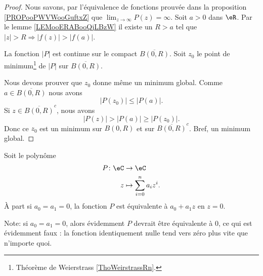 \begin{proof}
	Nous savons, par l'équivalence de fonctions prouvée dans la proposition \ref{PROPooPWVWooGuftxZ} que \( \lim_{z\to \infty} P(z)=\infty\). Soit \( a>0\) dans \( \eR\). Par le lemme \ref{LEMooERABooQjLBzW} il existe un \( R>a\) tel que \( | z |>R\Rightarrow | f(z) |>| f(a) |\).

	La fonction \( | P |\) est continue sur le compact \( \overline{ B(0,R) }\). Soit \( z_0\) le point de minimum\footnote{Théorème de Weierstrass \ref{ThoWeirstrassRn}.} de \( | P |\) sur \( \overline{ B(0,R) }\).

	Nous devons prouver que \( z_0\) donne même un minimum global. Comme \( a\in\overline{ B(0,R) }\) nous avons
	\begin{equation}
		| P(z_0) |\leq | P(a) |.
	\end{equation}
	Si \( z\in \overline{ B(0,R) }^c\), nous avons
	\begin{equation}
		| P(z) |>| P(a) |\geq | P(z_0) |.
	\end{equation}
	Donc ce \( z_0\) est un minimum sur \( B(0,R)\) et sur \( \overline{ B(0,R) }^c\). Bref, un minimum global.
\end{proof}

\begin{lemma}       \label{LEMooTTOYooXaukuH}
	Soit le polynôme
	\begin{equation}
		\begin{aligned}
			P\colon \eC & \to \eC                     \\
			z           & \mapsto \sum_{i=0}^na_iz^i.
		\end{aligned}
	\end{equation}
    À part si \( a_0=a_1=0\), la fonction \( P\) est équivalente à \( a_0+a_1z\) en \( z=0\).
\end{lemma}

Note: si \( a_0=a_1=0\), alors évidemment \( P\) devrait être équivalente à \( 0\), ce qui est évidemment faux : la fonction identiquement nulle tend vers zéro plus vite que n'importe quoi.

